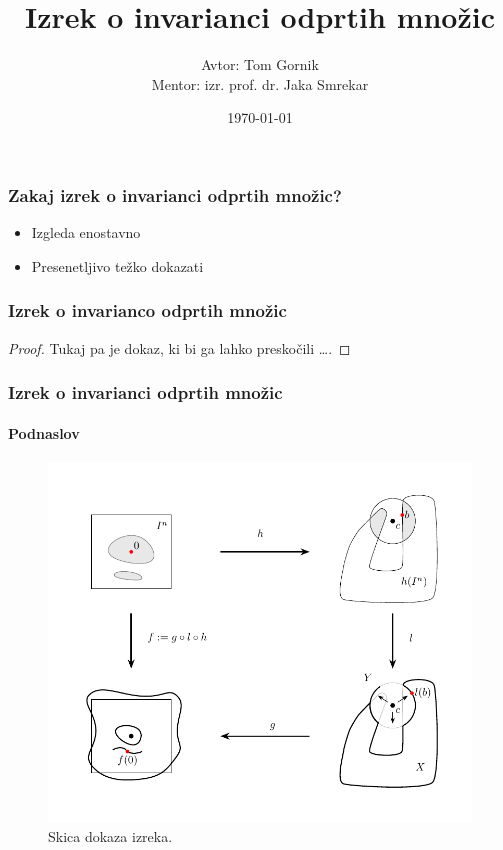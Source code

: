 \documentclass{beamer}
\title{Izrek o invarianci odprtih množic}
\author[Tom Gornik]{Avtor: Tom Gornik\\ \footnotesize Mentor: izr. prof. dr. Jaka Smrekar}
\institute{Fakulteta za matematiko in fiziko}
\date{\today}
\begin{document}

\frame{\titlepage}

\begin{frame}

\frametitle{Zakaj izrek o invarianci odprtih množic?}

\begin{itemize}
\item Izgleda enostavno
\item Presenetljivo težko dokazati

\end{itemize}



\end{frame}

\begin{frame}

\frametitle{Izrek o invarianco odprtih množic}
\begin{overprint}
 \hfill{}
\begin{proof}
Tukaj pa je dokaz, ki bi ga lahko preskočili \ldots.
\end{proof}
\end{overprint}

\end{frame}

\begin{frame}
\frametitle{Izrek o invarianci odprtih množic}
\framesubtitle{Podnaslov}
\begin{figure}[h!]
	\centering
	\includegraphics[scale=0.7]{glavna_slika.pdf}%
	\caption{Skica dokaza izreka.}
\end{figure}
\end{frame}
\end{document}
